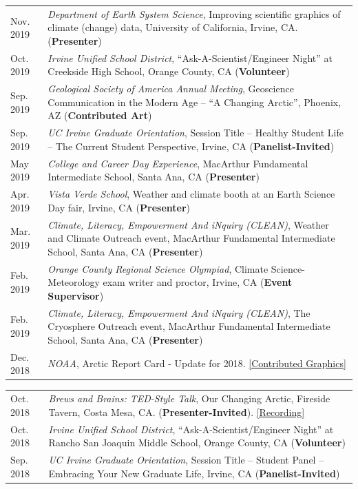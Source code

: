 \documentclass[margin,line,palatino,courier,10pt]{res}
\begin{document}
\begin{resume}
\begin{tabular}{@{}p{0.9in}p{4in}}
Nov. 2019 & \textit{Department of Earth System Science}, Improving scientific graphics of climate (change) data, University of California, Irvine, CA. (\textbf{Presenter})\\
Oct. 2019 & \textit{Irvine Unified School District}, ``Ask-A-Scientist/Engineer Night'' at Creekside High School, Orange County, CA (\textbf{Volunteer})\\
Sep. 2019 & \textit{Geological Society of America Annual Meeting}, Geoscience Communication in the Modern Age -- ``A Changing Arctic'', Phoenix, AZ (\textbf{Contributed Art})\\
Sep. 2019 & \textit{UC Irvine Graduate Orientation}, Session Title -- Healthy Student Life -- The Current Student Perspective, Irvine, CA (\textbf{Panelist-Invited})\\
May 2019 & \textit{College and Career Day Experience}, MacArthur Fundamental Intermediate School, Santa Ana, CA (\textbf{Presenter})\\
Apr. 2019 & \textit{Vista Verde School}, Weather and climate booth at an Earth Science Day fair, Irvine, CA (\textbf{Presenter})\\
Mar. 2019 & \textit{Climate, Literacy, Empowerment And iNquiry (CLEAN)}, Weather and Climate Outreach event, MacArthur Fundamental Intermediate School, Santa Ana, CA (\textbf{Presenter})\\
Feb. 2019 & \textit{Orange County Regional Science Olympiad}, Climate Science-Meteorology exam writer and proctor, Irvine, CA (\textbf{Event Supervisor})\\
Feb. 2019 & \textit{Climate, Literacy, Empowerment And iNquiry (CLEAN)}, The Cryosphere Outreach event, MacArthur Fundamental Intermediate School, Santa Ana, CA (\textbf{Presenter})\\
Dec. 2018 & \textit{NOAA}, Arctic Report Card - Update for 2018. \href{https://www.youtube.com/watch?v=XntO9a-NpeM}{[Contributed Graphics]}\\
\end{tabular}
\begin{tabular}{@{}p{0.9in}p{4in}}
Oct. 2018 & \textit{Brews and Brains: TED-Style Talk}, Our Changing Arctic, Fireside Tavern, Costa Mesa, CA. (\textbf{Presenter-Invited}). \href{https://www.youtube.com/watch?v=A5qQpDtOdvg}{[Recording]}\\
Oct. 2018 & \textit{Irvine Unified School District}, ``Ask-A-Scientist/Engineer Night'' at Rancho San Joaquin Middle School, Orange County, CA (\textbf{Volunteer})\\
Sep. 2018 & \textit{UC Irvine Graduate Orientation}, Session Title -- Student Panel -- Embracing Your New Graduate Life, Irvine, CA (\textbf{Panelist-Invited})\\

\end{tabular}
\end{resume}
\end{document}
